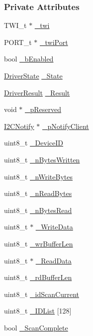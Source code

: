 \subsubsection*{Private Attributes}
\begin{DoxyCompactItemize}
\item 
TWI\_\-t $\ast$ \hyperlink{class_i2_c___master_acec901e88e497316233e95427aad8109}{\_\-twi}
\item 
PORT\_\-t $\ast$ \hyperlink{class_i2_c___master_aaafce0aec29b755962a0ea238dac3efc}{\_\-twiPort}
\item 
bool \hyperlink{class_i2_c___master_a4ef9478af9e40ec28c50bfecc98ed0e9}{\_\-bEnabled}
\item 
\hyperlink{class_i2_c___master_aaa6720f57770cfe755cb3d6dfc665cfa}{DriverState} \hyperlink{class_i2_c___master_ad17124f9fe760867850a703f25395e04}{\_\-State}
\item 
\hyperlink{class_i2_c___master_aff65d5186eee9d33563619432439cb53}{DriverResult} \hyperlink{class_i2_c___master_a38705a3f645b354f6a6129e098ad0412}{\_\-Result}
\item 
void $\ast$ \hyperlink{class_i2_c___master_a494a0fcf46a92be6ee09c7808cfe124b}{\_\-pReserved}
\item 
\hyperlink{class_i2_c_notify}{I2CNotify} $\ast$ \hyperlink{class_i2_c___master_afd30fbb495c05f3d7c32e8e7f7a4e6c3}{\_\-pNotifyClient}
\item 
uint8\_\-t \hyperlink{class_i2_c___master_aeb00aa4237885a47a3920755431285c5}{\_\-DeviceID}
\item 
uint8\_\-t \hyperlink{class_i2_c___master_a08b342fa7f11616f599e1276b1fa1cc2}{\_\-nBytesWritten}
\item 
uint8\_\-t \hyperlink{class_i2_c___master_a8d6a0152a9e2c953bafb0b26125b0c0c}{\_\-nWriteBytes}
\item 
uint8\_\-t \hyperlink{class_i2_c___master_a4e54f11353ad9845dabdc7d48ea97fca}{\_\-nReadBytes}
\item 
uint8\_\-t \hyperlink{class_i2_c___master_a7e97900b93001268e8f9b96332d60764}{\_\-nBytesRead}
\item 
uint8\_\-t $\ast$ \hyperlink{class_i2_c___master_a2264d47bd650403c72080dc09b304680}{\_\-WriteData}
\item 
uint8\_\-t \hyperlink{class_i2_c___master_adf3960dd4bcb3fa2079e08f14d307d23}{\_\-wrBufferLen}
\item 
uint8\_\-t $\ast$ \hyperlink{class_i2_c___master_a9e8bd8e827c375603f88c5ee0249d3e9}{\_\-ReadData}
\item 
uint8\_\-t \hyperlink{class_i2_c___master_a22fac4149c282d0e9ce8d91624f39488}{\_\-rdBufferLen}
\item 
uint8\_\-t \hyperlink{class_i2_c___master_a76886e0b4c524514d148e50152995eec}{\_\-idScanCurrent}
\item 
uint8\_\-t \hyperlink{class_i2_c___master_ac2663e392ba8d83af66355126601e3e9}{\_\-IDList} \mbox{[}128\mbox{]}
\item 
bool \hyperlink{class_i2_c___master_a6c603fca408bcac812e5fbaee8498bd2}{\_\-ScanComplete}
\end{DoxyCompactItemize}


